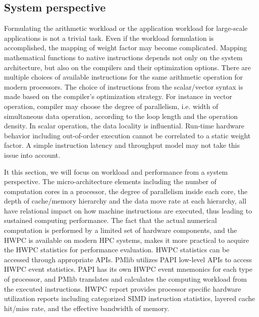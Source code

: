 \documentclass[conference]{IEEEtran}
\begin{document}
\subsection{System perspective}
\label{subsection:system-perspective}

Formulating the arithmetic workload or the application workload
for large-scale applications is not a trivial task.
Even if the workload formulation is accomplished,
the mapping of weight factor may become complicated.
Mapping mathematical functions to native instructions
depends not only on the system architecture, but also on the compilers
and their optimization options.
There are multiple choices of available instructions for the same
arithmetic operation for modern processors.
The choice of instructions from the scalar/vector syntax is made based on the
compiler's optimization strategy.
For instance in vector operation, compiler may choose
the degree of parallelism, i.e. width of simultaneous data operation,
according to the loop length and the operation density.
In scalar operation, the data locality is influential.
Run-time hardware behavior including out-of-order execution cannot
be correlated to a static weight factor.
A simple instruction latency and throughput model may not take this issue
into account.

It this section, we will focus on workload and performance from
a system perspective.
The micro-architecture elements including the number of computation cores
in a processor, the degree of parallelism inside each core,
the depth of cache/memory hierarchy and the data move rate at each hierarchy,
all have relational impact on how machine instructions are executed,
thus leading to sustained computing performance.
The fact that the actual numerical computation is performed by a
limited set of hardware components, and the HWPC is available
on modern HPC systems, makes it more practical to acquire the HWPC statistics
for performance evaluation.
HWPC statistics can be accessed through appropriate APIs.
PMlib utilizes PAPI low-level APIs to access HWPC event statistics.
PAPI has its own HWPC event mnemonics for each type of processor,
and PMlib translates and
calculates the computing workload from the executed instructions.
HWPC report provides processor specific hardware utilization reports
including categorized SIMD instruction statistics, layered cache
hit/miss rate, and the effective bandwidth of memory.
\end{document}
